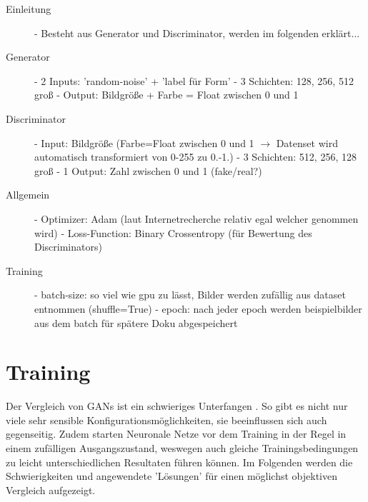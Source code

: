 \begin{description}
	\item[Einleitung] 
	- Besteht aus Generator und Discriminator, werden im folgenden erklärt...
	
	\item[Generator] 
	- 2 Inputs: 'random-noise' + 'label für Form' \newline
	- 3 Schichten: 128, 256, 512 groß \newline
	- Output: Bildgröße + Farbe = Float zwischen 0 und 1
	
	\item[Discriminator]
	- Input: Bildgröße (Farbe=Float zwischen 0 und 1 $\rightarrow$ Datenset wird automatisch transformiert von 0-255 zu 0.-1.) \newline
	- 3 Schichten: 512, 256, 128 groß \newline
	- 1 Output: Zahl zwischen 0 und 1 (fake/real?)
	
	\item[Allgemein]
	- Optimizer: Adam (laut Internetrecherche relativ egal welcher genommen wird) \newline
	- Loss-Function: Binary Crossentropy (für Bewertung des Discriminators)
	
	\item[Training]
	- batch-size: so viel wie gpu zu lässt, Bilder werden zufällig aus dataset entnommen (shuffle=True) \newline
	- epoch: nach jeder epoch werden beispielbilder aus dem batch für spätere Doku abgespeichert
	
\end{description}




\section{Training}
Der Vergleich von GANs ist ein schwieriges Unterfangen \cite{are-gans-created-equally}.
So gibt es nicht nur viele sehr sensible Konfigurationsmöglichkeiten, sie beeinflussen sich auch gegenseitig.
Zudem starten Neuronale Netze vor dem Training in der Regel in einem zufälligen Ausgangszustand, weswegen auch gleiche Trainingsbedingungen zu leicht unterschiedlichen Resultaten führen können.
Im Folgenden werden die Schwierigkeiten und angewendete 'Lösungen' für einen möglichst objektiven Vergleich aufgezeigt.


